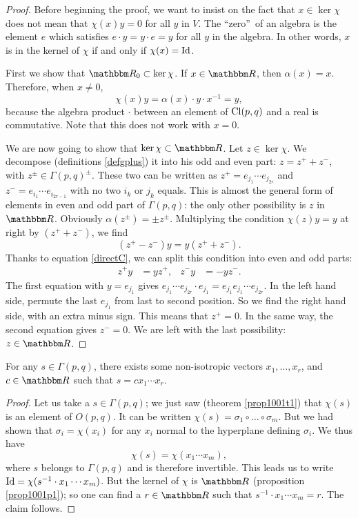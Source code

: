 \begin{proof}
Before beginning the proof, we want to insist on the fact that $x\in \ker\chi$ does not mean that $\chi(x)y=0$ for all $y$ in $V$. The ``zero''\ of an algebra is the element $e$ which satisfies $e\cdot y=y\cdot e=y$ for all $y$ in the algebra. In other words, $x$ is in the kernel of $\chi$ if and only if $\chi(x)=\operatorname{Id}$.

First we show that $\eR_0\subset \ker\chi$. If $x\in \eR$, then $\alpha(x)=x$. Therefore, when $x\neq 0$,
\[
\chi(x)y=\alpha(x)\cdot y\cdot x^{-1}=y,
\]
because the algebra product $\cdot$ between an element of $\operatorname{Cl}(p,q)$ and a real is commutative. Note that this does not work with $x=0$.

We are now going to show that $\ker\chi\subset\eR$. Let $z\in\ker\chi$. We decompose (definitions \eqref{defgplus}) it into his odd and even part: $z=z^++z^-$, with $z^{\pm}\in\Gamma(p,q)^{\pm}$. These two can be written as $z^+=e_{j_1}\cdots e_{j_{2r}}$ and $z^-=e_{i_1}\cdots e_{i_{2r-1}}$ with no two $i_k$ or $j_k$ equals. This is almost the general form of elements in even and odd part of $\Gamma(p,q)$: the only other possibility is $z$ in $\eR$. Obviously $\alpha(z^{\pm})=\pm z^{\pm}$. Multiplying the condition $\chi(z)y=y$ at right by $(z^++z^-)$, we find \[(z^+-z^-)y=y(z^++z^-).\] Thanks to equation \eqref{directC}, we can split this condition into even and odd parts:
\begin{align}
 z^+y&=yz^+,
 &z^-y&=-yz^-.
\end{align}
The first equation with $y=e_{j_1}$ gives $e_{j_1}\cdots e_{j_{2r}}\cdot e_{j_1}=e_{j_1}e_{j_1}\cdots e_{j_{2r}}$. In the left hand side, permute the last $e_{j_1}$ from last to second position. So we find the right hand side, with an extra minus sign. This means that $z^+=0$. In the same way, the second equation gives $z^-=0$. We are left with the last possibility: $z\in\eR$.
\end{proof}

\begin{corollary}
For any $s\in\Gamma(p,q)$, there exists some non-isotropic vectors $x_1,\ldots,x_r$, and $c\in\eR$ such that $s=cx_1\cdots x_r$.
\label{602c1}
\end{corollary}

\begin{proof}
Let us take a $s\in\Gamma(p,q)$; we just saw (theorem \ref{prop1001t1}) that $\chi(s)$ is an element of $O(p,q)$. It can be written $\chi(s)=\sigma_1\circ\ldots\circ\sigma_m$. But we had shown that $\sigma_i=\chi(x_i)$ for any $x_i$ normal to the hyperplane defining $\sigma_i$. We thus have
\[
     \chi(s)=\chi(x_1\cdots x_m),
\] 
where $s$ belongs to $\Gamma(p,q)$ and is therefore invertible. This leads us to write $\operatorname{Id}=\chi(s^{-1}\cdot x_1\cdots x_m)$. But the kernel of $\chi$ is $\eR$ (proposition \ref{prop1001p1}); so one can find a $r\in\eR$ such that $s^{-1}\cdot x_1\cdots x_m=r$. The claim follows.
\end{proof}

